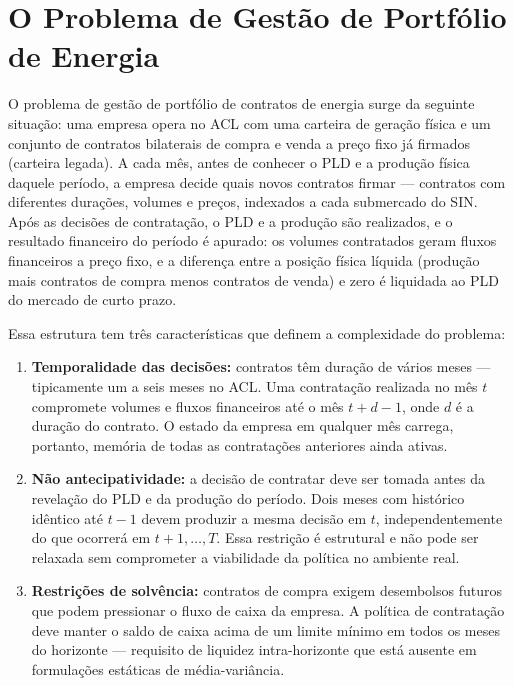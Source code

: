 \section{O Problema de Gestão de Portfólio de Energia}
\label{sec:problema}

O problema de gestão de portfólio de contratos de energia surge da seguinte situação: uma empresa opera no ACL com uma carteira de geração física e um conjunto de contratos bilaterais de compra e venda a preço fixo já firmados (carteira legada). A cada mês, antes de conhecer o PLD e a produção física daquele período, a empresa decide quais novos contratos firmar --- contratos com diferentes durações, volumes e preços, indexados a cada submercado do SIN. Após as decisões de contratação, o PLD e a produção são realizados, e o resultado financeiro do período é apurado: os volumes contratados geram fluxos financeiros a preço fixo, e a diferença entre a posição física líquida (produção mais contratos de compra menos contratos de venda) e zero é liquidada ao PLD do mercado de curto prazo.

Essa estrutura tem três características que definem a complexidade do problema:

\begin{enumerate}
  \item \textbf{Temporalidade das decisões:} contratos têm duração de vários meses --- tipicamente um a seis meses no ACL. Uma contratação realizada no mês $t$ compromete volumes e fluxos financeiros até o mês $t + d - 1$, onde $d$ é a duração do contrato. O estado da empresa em qualquer mês carrega, portanto, memória de todas as contratações anteriores ainda ativas.

  \item \textbf{Não antecipatividade:} a decisão de contratar deve ser tomada antes da revelação do PLD e da produção do período. Dois meses com histórico idêntico até $t-1$ devem produzir a mesma decisão em $t$, independentemente do que ocorrerá em $t+1, \ldots, T$. Essa restrição é estrutural e não pode ser relaxada sem comprometer a viabilidade da política no ambiente real.

  \item \textbf{Restrições de solvência:} contratos de compra exigem desembolsos futuros que podem pressionar o fluxo de caixa da empresa. A política de contratação deve manter o saldo de caixa acima de um limite mínimo em todos os meses do horizonte --- requisito de liquidez intra-horizonte que está ausente em formulações estáticas de média-variância.
\end{enumerate}


